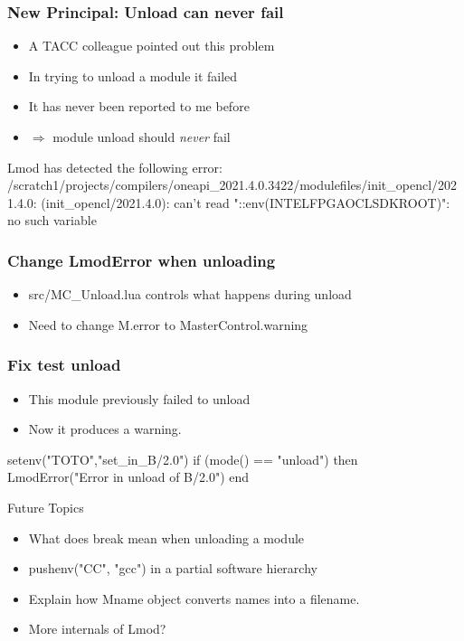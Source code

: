 \documentclass{beamer}
\begin{document}
\begin{frame}[fragile]
    \frametitle{New Principal: Unload can never fail}
  \begin{itemize}
    \item A TACC colleague pointed out this problem
    \item In trying to unload a module it failed
    \item It has never been reported to me before
    \item $\Rightarrow$ module unload should \emph{never} fail
  \end{itemize}
 {\tiny
    \begin{semiverbatim}
Lmod has detected the following error:
/scratch1/projects/compilers/oneapi\_2021.4.0.3422/modulefiles/init\_opencl/2021.4.0:
(init\_opencl/2021.4.0): can't read "::env(INTELFPGAOCLSDKROOT)": no such variable
    \end{semiverbatim}
}
\end{frame}

\begin{frame}[fragile]
    \frametitle{Change LmodError when unloading}
  \begin{itemize}
    \item src/MC_Unload.lua controls what happens during unload
    \item Need to change M.error to MasterControl.warning
  \end{itemize}
\end{frame}

\begin{frame}[fragile]
    \frametitle{Fix test unload}
  \begin{itemize}
    \item This module previously failed to unload
    \item Now it produces a warning.
  \end{itemize}

 {\small
    \begin{semiverbatim}
setenv("TOTO","set\_in\_B/2.0")
if (mode() == "unload") then
   LmodError("Error in unload of B/2.0")
end
    \end{semiverbatim}
}
\end{frame}

\begin{frame}{Future Topics}
  \begin{itemize}
    \item What does break mean when unloading a module
    \item pushenv("CC", "gcc") in a partial software hierarchy
    \item Explain how Mname object converts names into a filename.
    \item More internals of Lmod?
  \end{itemize}
\end{frame}
\end{document}
